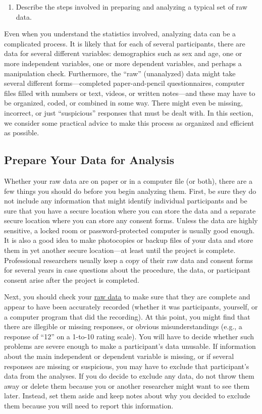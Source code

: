\documentclass[
]{krantz}
\providecommand{\tightlist}{%
  \setlength{\itemsep}{0pt}\setlength{\parskip}{0pt}}
\begin{document}
\begin{enumerate}
\def\labelenumi{\arabic{enumi}.}
\tightlist
\item
  Describe the steps involved in preparing and analyzing a typical set of raw data.
\end{enumerate}

Even when you understand the statistics involved, analyzing data can be a complicated process. It is likely that for each of several participants, there are data for several different variables: demographics such as sex and age, one or more independent variables, one or more dependent variables, and perhaps a manipulation check. Furthermore, the ``raw'' (unanalyzed) data might take several different forms---completed paper-and-pencil questionnaires, computer files filled with numbers or text, videos, or written notes---and these may have to be organized, coded, or combined in some way. There might even be missing, incorrect, or just ``suspicious'' responses that must be dealt with. In this section, we consider some practical advice to make this process as organized and efficient as possible.

\hypertarget{prepare-your-data-for-analysis}{%
\subsection*{Prepare Your Data for Analysis}\label{prepare-your-data-for-analysis}}


Whether your raw data are on paper or in a computer file (or both), there are a few things you should do before you begin analyzing them. First, be sure they do not include any information that might identify individual participants and be sure that you have a secure location where you can store the data and a separate secure location where you can store any consent forms. Unless the data are highly sensitive, a locked room or password-protected computer is usually good enough. It is also a good idea to make photocopies or backup files of your data and store them in yet another secure location---at least until the project is complete. Professional researchers usually keep a copy of their raw data and consent forms for several years in case questions about the procedure, the data, or participant consent arise after the project is completed.

Next, you should check your \protect\hyperlink{raw-data}{raw data} to make sure that they are complete and appear to have been accurately recorded (whether it was participants, yourself, or a computer program that did the recording). At this point, you might find that there are illegible or missing responses, or obvious misunderstandings (e.g., a response of ``12'' on a 1-to-10 rating scale). You will have to decide whether such problems are severe enough to make a participant's data unusable. If information about the main independent or dependent variable is missing, or if several responses are missing or suspicious, you may have to exclude that participant's data from the analyses. If you do decide to exclude any data, do not throw them away or delete them because you or another researcher might want to see them later. Instead, set them aside and keep notes about why you decided to exclude them because you will need to report this information.
\end{document}
